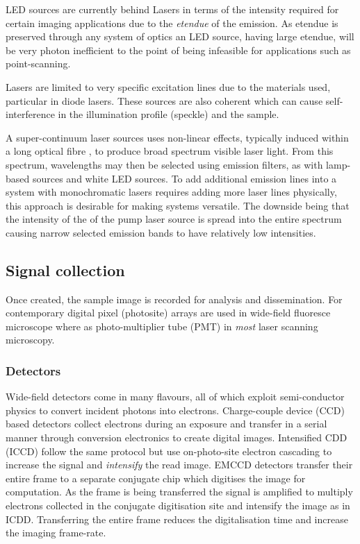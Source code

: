 LED sources are currently behind Lasers in terms of the intensity required for certain imaging applications due to the \emph{etendue} of the emission.
As etendue is preserved through any system of optics an LED source, having large etendue, will be very photon inefficient to the point of being infeasible for applications such as point-scanning.

Lasers are limited to very specific excitation lines due to the materials used, particular in diode lasers.
These sources are also coherent which can cause self-interference in the illumination profile (speckle) and the sample.

A super-continuum laser sources uses non-linear effects, typically induced within a long optical fibre , to produce broad spectrum visible laser light.
From this spectrum, wavelengths may then be selected using emission filters, as with lamp-based sources and white LED sources.
To add additional emission lines into a system with monochromatic lasers requires adding more laser lines physically, this approach is desirable for making systems versatile.
The downside being that the intensity of the of the pump laser source is spread into the entire spectrum causing narrow selected emission bands to have relatively low intensities.


\subsection{Signal collection}

Once created, the sample image is recorded for analysis and dissemination.
For contemporary digital pixel (photosite) arrays are used in wide-field fluoresce microscope where as photo-multiplier tube (PMT) in \emph{most} laser scanning microscopy.

\subsubsection{Detectors}

Wide-field detectors come in many flavours, all of which exploit semi-conductor physics to convert incident photons into electrons.
Charge-couple device (CCD) based detectors collect electrons during an exposure and transfer in a serial manner through conversion electronics to create digital images.
Intensified CDD (ICCD) follow the same protocol but use on-photo-site electron cascading to increase the signal and \emph{intensify} the read image.
EMCCD detectors transfer their entire frame to a separate conjugate chip which digitises the image for computation.
As the frame is being transferred the signal is amplified to multiply electrons collected in the conjugate digitisation site and intensify the image as in ICDD.
Transferring the entire frame reduces the digitalisation time and increase the imaging frame-rate.

